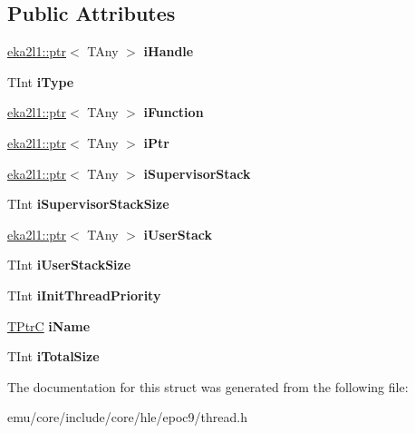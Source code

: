\subsection*{Public Attributes}
\begin{DoxyCompactItemize}
\item 
\mbox{\label{struct_s_thread_create_info_a2f701fba5643bff34096ff90d50393fb}} 
\mbox{\hyperlink{classeka2l1_1_1ptr}{eka2l1\+::ptr}}$<$ T\+Any $>$ {\bfseries i\+Handle}
\item 
\mbox{\label{struct_s_thread_create_info_af73f859902ea48e4b64401ac889b1472}} 
T\+Int {\bfseries i\+Type}
\item 
\mbox{\label{struct_s_thread_create_info_a42ae52b29ce2a09ae83111131182fd38}} 
\mbox{\hyperlink{classeka2l1_1_1ptr}{eka2l1\+::ptr}}$<$ T\+Any $>$ {\bfseries i\+Function}
\item 
\mbox{\label{struct_s_thread_create_info_a46ce60b5c561d0f1356daa57767f58c5}} 
\mbox{\hyperlink{classeka2l1_1_1ptr}{eka2l1\+::ptr}}$<$ T\+Any $>$ {\bfseries i\+Ptr}
\item 
\mbox{\label{struct_s_thread_create_info_a4802f155e757067bbdabe51b78eaefa3}} 
\mbox{\hyperlink{classeka2l1_1_1ptr}{eka2l1\+::ptr}}$<$ T\+Any $>$ {\bfseries i\+Supervisor\+Stack}
\item 
\mbox{\label{struct_s_thread_create_info_a0b18e4d5e33c8e52f62855793bdd8b55}} 
T\+Int {\bfseries i\+Supervisor\+Stack\+Size}
\item 
\mbox{\label{struct_s_thread_create_info_aaebf7e9d7535fa006cc3062e9284b3a1}} 
\mbox{\hyperlink{classeka2l1_1_1ptr}{eka2l1\+::ptr}}$<$ T\+Any $>$ {\bfseries i\+User\+Stack}
\item 
\mbox{\label{struct_s_thread_create_info_a027815aae8b488cb4d69b8b0f4ef0aef}} 
T\+Int {\bfseries i\+User\+Stack\+Size}
\item 
\mbox{\label{struct_s_thread_create_info_ae2fae759bf913cc0cf517107d74eda74}} 
T\+Int {\bfseries i\+Init\+Thread\+Priority}
\item 
\mbox{\label{struct_s_thread_create_info_a85dd6152183dc70a8ff433058b0fec4d}} 
\mbox{\hyperlink{struct_t_ptr_c16}{T\+PtrC}} {\bfseries i\+Name}
\item 
\mbox{\label{struct_s_thread_create_info_aa9b913e9238b6086cbd506956415a82b}} 
T\+Int {\bfseries i\+Total\+Size}
\end{DoxyCompactItemize}


The documentation for this struct was generated from the following file\+:\begin{DoxyCompactItemize}
\item 
emu/core/include/core/hle/epoc9/thread.\+h\end{DoxyCompactItemize}
